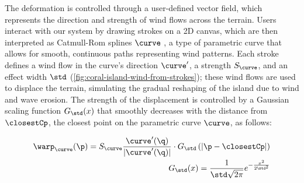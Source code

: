 




The deformation is controlled through a user-defined vector field, which represents the direction and strength of wind flows across the terrain. Users interact with our system by drawing strokes on a 2D canvas, which are then interpreted as Catmull-Rom splines $\curve$ \cite{Catmull1974}, a type of parametric curve that allows for smooth, continuous paths representing wind patterns. Each stroke defines a wind flow in the curve's direction $\curve'$, a strength $S_\curve$, and an effect width $\std$ (\cref{fig:coral-island-wind-from-strokes}); these wind flows are used to displace the terrain, simulating the gradual reshaping of the island due to wind and wave erosion. The strength of the displacement is controlled by a Gaussian scaling function $G_\std(x)$ that smoothly decreases with the distance from $\closestCp$, the closest point on the parametric curve $\curve$, as follows:

\begin{align}
    \warp_\curve(\p) = S_\curve \frac{\curve'(\q)}{| \curve'(\q) | } \cdot G_\std\left(| \p - \closestCp | \right) \\
    G_\std(x) = \frac{1}{\std \sqrt{2\pi}} e^{-\frac{x^2}{2 \std^2}}
\end{align}


